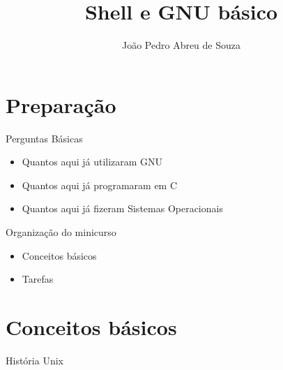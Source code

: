 \documentclass{beamer}
\title{Shell e GNU básico}
\author{João Pedro Abreu de Souza}
\begin{document}
\maketitle
\section{Preparação}
\begin{frame}{Perguntas Básicas}
	\begin{itemize}
		\item Quantos aqui já utilizaram GNU
		\pause
		\item Quantos aqui já programaram em C
		\pause
		\item Quantos aqui já fizeram Sistemas Operacionais
	\end{itemize}
\end{frame}
\begin{frame}{Organização do minicurso}
 \begin{itemize}
     \item Conceitos básicos
     \item Tarefas
 \end{itemize}
\end{frame}
\section{Conceitos básicos}
\begin{frame}{História Unix}
	
\end{frame}
\end{document}
